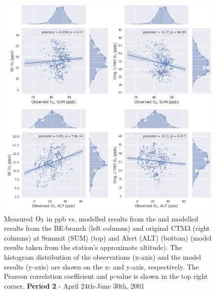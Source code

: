 \begin{figure}[ht]
    \centering
    \includegraphics[width = \linewidth]{Chapter6_Results/images/Orig_BE_comp/jointplot_AprJune_ALTSUM_O3_2001.png}
    \caption{Measured $\mathrm{O_3}$ in ppb vs. modelled results from the and modelled results from the BE-branch (left columns) and original CTM3 (right columns) at Summit (SUM) (top) and Alert (ALT) (bottom) (model results taken from the station's approximate altitude). The histogram distribution of the observations (x-axis) and the model results (y-axis) are shown on the x- and y-axis, respectively. The Pearson correlation coefficient and p-value is shown in the top right corner. \textbf{Period 2} - April 24th-June 30th, 2001}
    \label{fig:joint_AprMay_ALTSUM}
\end{figure}